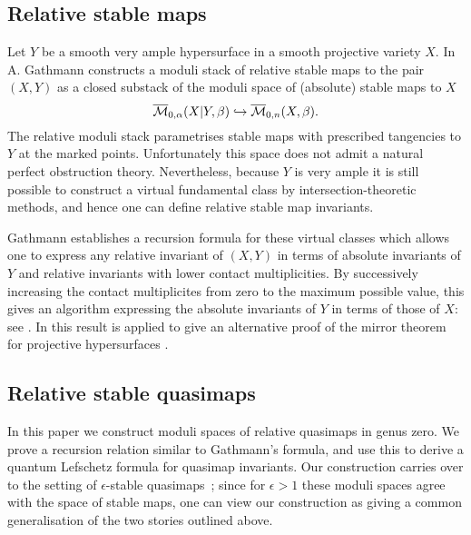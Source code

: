 
\subsection{Relative stable maps}
Let $Y$ be a smooth very ample hypersurface in a smooth projective variety $X$. In \cite{Ga} A. Gathmann constructs a moduli stack of relative stable maps to the pair $(X,Y)$ as a closed substack of the moduli space of (absolute) stable maps to $X$
\begin{equation*} \overline{\mathcal M}_{0,\alpha}(X|Y,\beta) \hookrightarrow \overline{\mathcal M}_{0,n}(X,\beta). \end{equation*}
The relative moduli stack parametrises stable maps with prescribed tangencies to $Y$ at the marked points.  Unfortunately this space does not admit a natural perfect obstruction theory. Nevertheless, because $Y$ is very ample it is still possible to construct a virtual fundamental class by intersection-theoretic methods, and hence one can define relative stable map invariants.

Gathmann establishes a recursion formula for these virtual classes which allows one to express any relative invariant of $(X,Y)$ in terms of absolute invariants of $Y$ and relative invariants with lower contact multiplicities. 
By successively increasing the contact multiplicites from zero to the maximum possible value, this gives an algorithm expressing the absolute invariants of $Y$ in terms of those of $X$: see \cite[Corollary 5.7]{Ga}. In \cite{Ga-MF} this result is applied to give an alternative proof of the mirror theorem for projective hypersurfaces \cite{GiventalEquivariant} \cite{LLY1}.

\subsection{Relative stable quasimaps}
In this paper we construct moduli spaces of relative quasimaps in genus zero. We prove a recursion relation similar to Gathmann's formula, and use this to derive a quantum Lefschetz formula for quasimap invariants.
Our construction carries over to the setting of $\epsilon$-stable quasimaps~\cite{CF-K}; since for $\epsilon > 1$ these moduli spaces agree with the space of stable maps, one can view our construction as giving a common generalisation of the two stories outlined above.

